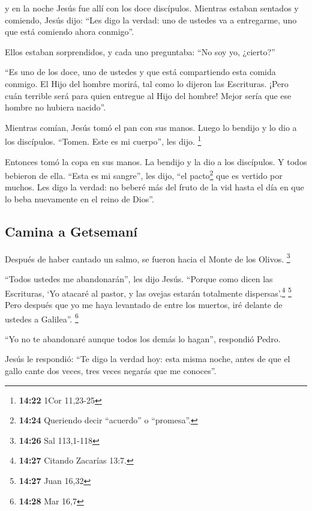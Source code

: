  y en la noche Jesús fue allí con los doce discípulos.
 Mientras estaban sentados y comiendo, Jesús dijo: ``Les
digo la verdad: uno de ustedes va a entregarme, uno que está comiendo
ahora conmigo''.

 Ellos estaban sorprendidos, y cada uno preguntaba: ``No
soy yo, ¿cierto?''

 ``Es uno de los doce, uno de ustedes y que está
compartiendo esta comida conmigo.  El Hijo del hombre
morirá, tal como lo dijeron las Escrituras. ¡Pero cuán terrible será
para quien entregue al Hijo del hombre! Mejor sería que ese hombre no
hubiera nacido''.

 Mientras comían, Jesús tomó el pan con sus manos. Luego
lo bendijo y lo dio a los discípulos. ``Tomen. Este es mi cuerpo'', les
dijo. \footnote{\textbf{14:22} 1Cor 11,23-25}

 Entonces tomó la copa en sus manos. La bendijo y la dio
a los discípulos. Y todos bebieron de ella.  ``Esta es mi
sangre'', les dijo, ``el pacto\footnote{\textbf{14:24} Queriendo decir
  ``acuerdo'' o ``promesa''.} que es vertido por muchos. 
Les digo la verdad: no beberé más del fruto de la vid hasta el día en
que lo beba nuevamente en el reino de Dios''.

\hypertarget{camina-a-getsemanuxed}{%
\subsection{Camina a Getsemaní}\label{camina-a-getsemanuxed}}

 Después de haber cantado un salmo, se fueron hacia el
Monte de los Olivos. \footnote{\textbf{14:26} Sal 113,1-118}

 ``Todos ustedes me abandonarán'', les dijo Jesús.
``Porque como dicen las Escrituras, `Yo atacaré al pastor, y las ovejas
estarán totalmente dispersas'.\footnote{\textbf{14:27} Citando Zacarías
  13:7.} \footnote{\textbf{14:27} Juan 16,32}  Pero
después que yo me haya levantado de entre los muertos, iré delante de
ustedes a Galilea''. \footnote{\textbf{14:28} Mar 16,7}

 ``Yo no te abandonaré aunque todos los demás lo hagan'',
respondió Pedro.

 Jesús le respondió: ``Te digo la verdad hoy: esta misma
noche, antes de que el gallo cante dos veces, tres veces negarás que me
conoces''.

